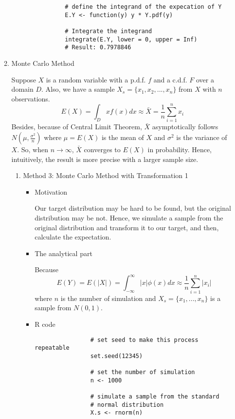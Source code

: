 \documentclass[12pt]{article}
\begin{document}
\begin{enumerate}
\begin{enumerate}
\begin{itemize}
\begin{verbatim}
			# define the integrand of the expecation of Y
			E.Y <- function(y) y * Y.pdf(y)
			
			# Integrate the integrand
			integrate(E.Y, lower = 0, upper = Inf)
			# Result: 0.7978846
			\end{verbatim}
		\end{itemize}
		\item Monte Carlo Method
		\par Suppose $X$ is a random variable with a p.d.f. $f$ and a c.d.f. $F$ over a domain $D$. Also, we have a sample $X_s = \{x_1, x_2, ..., x_n\}$ from $X$ with $n$ observations.
		\begin{equation*}
		E(X) = \int_{D}xf(x)dx \approx \bar{X} = \frac{1}{n} \sum_{i = 1}^{n}x_i
		\end{equation*}
		Besides, because of Central Limit Theorem, $\bar{X}$ asymptotically follows $N(\mu, \frac{\sigma^2}{n})$ where $\mu = E(X)$ is the mean of $X$ and $\sigma^2$ is the variance of $X$. So, when $n \rightarrow \infty$, $\bar{X}$ converges to $E(X)$ in probability. Hence, intuitively, the result is more precise with a larger sample size.
		\begin{enumerate}
			\item Method 3: Monte Carlo Method with Transformation 1
			\begin{itemize}
				\item Motivation
				\par Our target distribution may be hard to be found, but the original distribution may be not. Hence, we simulate a sample from the original distribution and transform it to our target, and then, calculate the expectation.
				\item 
				\par The analytical part
				\par Because 
				\begin{equation*}
				E(Y) = E(|X|) = \int_{-\infty}^{\infty}|x| \phi(x)dx \approx \frac{1}{n}\sum_{i = 1}^{n} |x_i|
				\end{equation*}
				where $n$ is the number of simulation and $X_s = \{ x_1, ..., x_n\}$ is a sample from $N(0, 1)$.
				\item R code
				\begin{verbatim}
				# set seed to make this process repeatable
				set.seed(12345)
				
				# set the number of simulation
				n <- 1000
				
				# simulate a sample from the standard 
				# normal distribution
				X.s <- rnorm(n)
				

\end{verbatim}
\end{itemize}
\end{enumerate}
\end{enumerate}
\end{enumerate}
\end{document}
